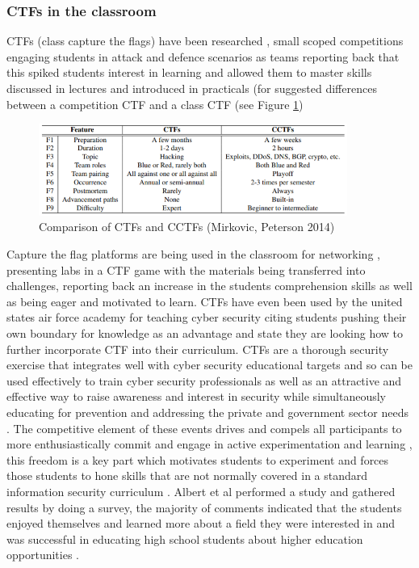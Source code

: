 \documentclass[12pt,a4paper]{article}
\begin{document}
\subsubsection{CTFs in the classroom}
CTFs (class capture the flags) have been researched \cite{mirkovic2014class}, small scoped competitions engaging students in attack and defence scenarios as teams reporting back that this spiked students interest in learning and allowed them to master skills discussed in lectures and introduced in practicals (for suggested differences between a competition CTF and a class CTF (see Figure \ref{fig:fig6})   

\begin{figure}[h]
    \centering
    \includegraphics[width=0.9\textwidth]{Figs/cctfs.PNG} 
    \caption{Comparison of CTFs and CCTFs (Mirkovic, Peterson 2014)}
    \label{fig:fig6}
\end{figure}    

Capture the flag platforms are being used in the classroom for networking \cite{prabawa2017using}, presenting labs in a CTF game with the materials being transferred into challenges, reporting back an increase in the students comprehension skills as well as being eager and motivated to learn. CTFs have even been used by the united states air force academy for teaching cyber security \cite{carlisle2015using} citing students pushing their own boundary for knowledge as an advantage and state they are looking how to further incorporate CTF into their curriculum. CTFs are a thorough security exercise that integrates well with cyber security educational targets and so can be used effectively to train cyber security professionals \cite{eagle2004capture1} as well as an attractive and effective way to raise awareness and interest in security while simultaneously educating for prevention and addressing the private and government sector needs \cite{albert2010high3}. The competitive element of these events drives and compels all participants to more enthusiastically commit and engage in active experimentation and learning \cite{albert2010high5}, this freedom is a key part which motivates students to experiment and forces those students to hone skills that are not normally covered in a standard information security curriculum \cite{eagle2004capture2}. Albert et al performed a study and gathered results by doing a survey, the majority of comments indicated that the students enjoyed themselves and learned more about a field they were interested in and was successful in educating high school students about higher education opportunities \cite{albert2010high6}. 
\end{document}
